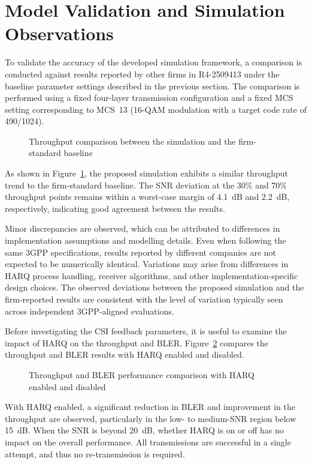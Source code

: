 \documentclass[a4paper,12pt,onecolumn]{article}
\begin{document}
	\section{Model Validation and Simulation Observations}
	
	To validate the accuracy of the developed simulation framework, a comparison is conducted against results reported by other firms in R4-2509413 \cite{3gpp_ran4_results} under the baseline parameter settings described in the previous section. The comparison is performed using a fixed four-layer transmission configuration and a fixed MCS setting corresponding to MCS~13 (16-QAM modulation with a target code rate of 490/1024).
	
	\begin{figure}[h]
		\centering
		
		\caption{Throughput comparison between the simulation and the firm-standard baseline}
		\label{fig:firmresultscomparison}
	\end{figure}

As shown in Figure~\ref{fig:firmresultscomparison}, the proposed simulation exhibits a similar throughput trend to the firm-standard baseline. The SNR deviation at the 30\% and 70\% throughput points remains within a worst-case margin of 4.1~dB and 2.2~dB, respectively, indicating good agreement between the results.


Minor discrepancies are observed, which can be attributed to differences in implementation assumptions and modelling details. Even when following the same 3GPP specifications, results reported by different companies are not expected to be numerically identical. Variations may arise from differences in HARQ process handling, receiver algorithms, and other implementation-specific design choices. The observed deviations between the proposed simulation and the firm-reported results are consistent with the level of variation typically seen across independent 3GPP-aligned evaluations.

Before investigating the CSI feedback parameters, it is useful to examine the impact of HARQ on the throughput and BLER. Figure~\ref{fig:harqonoff} compares the throughput and BLER results with HARQ enabled and disabled.


	\begin{figure}[h]
		\centering
		
		\caption{Throughput and BLER performance comparison with HARQ enabled and disabled}
		\label{fig:harqonoff}
	\end{figure}
With HARQ enabled, a significant reduction in BLER and improvement in the throughput are observed, particularly in the low- to medium-SNR region below 15~dB. When the SNR is beyond 20~dB, whether HARQ is on or off has no impact on the overall performance. All transmissions are successful in a single attempt, and thus no re-transmission is required. 
\end{document}
